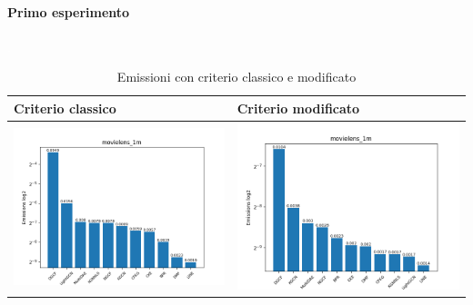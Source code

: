 \paragraph{Primo esperimento} \textcolor{white}{.} \\
\begin{table}[H]
    \centering
    \footnotesize
    \setlength\tabcolsep{0pt}
    \begin{tabularx}{\textwidth}{|X|X|}
        \hline
        \textbf{Criterio classico} & \textbf{Criterio modificato} \\
        \hline
        \includegraphics[width=\linewidth, trim=0 0 0 0]{images/emissions_movielens_1m_40_5_earlyClassic.png} &
        \includegraphics[width=\linewidth, trim=0 0 0 0]{images/emissions_movielens_1m_40_5_earlyModified.png} \\
        \hline
    \end{tabularx}
    \caption{Emissioni con criterio classico e modificato}
    \label{tab:emissions_info}
\end{table}




